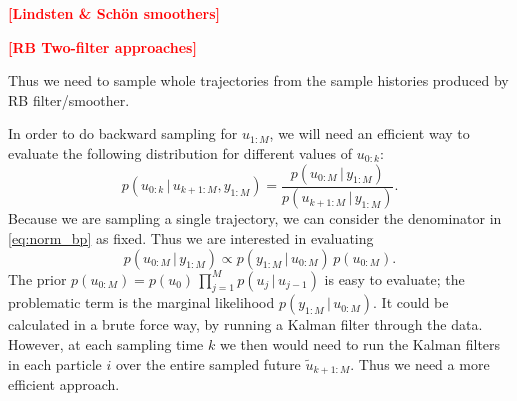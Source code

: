 \documentclass[twocolumn]{autart}    %
\newcommand{\comment}[1]{\textcolor{red}{\textbf{[#1]}}}
\begin{document}
\comment{Lindsten \& Sch\"on smoothers}

\comment{RB Two-filter approaches}





Thus we need to sample whole trajectories from the sample histories produced by RB filter/smoother. 



In order to do backward sampling for $u_{1:M}$, we will need an
efficient way to evaluate the following distribution for different
values of $u_{0:k}$:
%
\begin{equation}
  p(u_{0:k}\,|\,u_{k+1:M},y_{1:M})
  = \frac{p(u_{0:M}\,|\,y_{1:M})}{p(u_{k+1:M}\,|\,y_{1:M})}.
\label{eq:norm_bp}
\end{equation}
%
Because we are sampling a single trajectory, we can consider the
denominator in \eqref{eq:norm_bp} as fixed. Thus we are interested in
evaluating
%
\begin{equation}
  p(u_{0:M}\,|\,y_{1:M}) \propto p(y_{1:M}\,|\,u_{0:M}) \, p(u_{0:M}).
\end{equation}
%
The prior $p(u_{0:M}) = p(u_0) \, \prod_{j=1}^M p(u_{j}\,|\,u_{j-1})$
is easy to evaluate; the problematic term is the marginal likelihood
$p(y_{1:M}\,|\,u_{0:M})$. It could be calculated in a brute force way,
by running a Kalman filter through the data.  However, at each
sampling time $k$ we then would need to run the Kalman filters in each
particle $i$ over the entire sampled future $\tilde{u}_{k+1:M}$. Thus
we need a more efficient approach.
\end{document}

